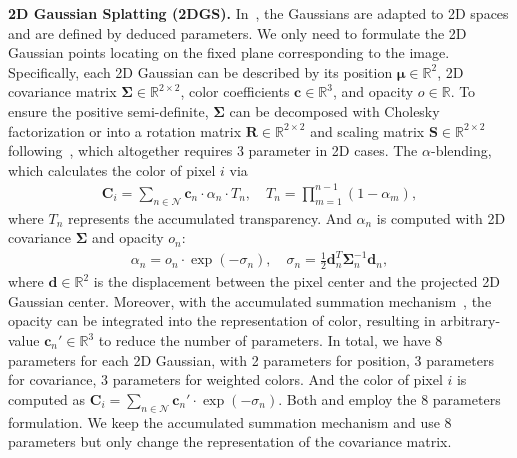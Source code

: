 \noindent \textbf{2D Gaussian Splatting (2DGS).}
In~\cite{zhang2024gaussianimage}, the Gaussians are adapted to 2D spaces and are defined by deduced parameters. We only need to formulate the 2D Gaussian points locating on the fixed plane corresponding to the image. Specifically, each 2D Gaussian can be described by its position $\bm \mu \in \mathbb{R}^{2}$, 2D covariance matrix $\bm \Sigma \in \mathbb{R}^{2\times 2}$, color coefficients $\bm c \in \mathbb{R}^3$, and opacity $o \in \mathbb{R}$. To ensure the positive semi-definite, $\bm \Sigma$ can be decomposed with Cholesky factorization or into a rotation matrix $\bm R \in \mathbb{R}^{2\times 2}$ and scaling matrix $\bm S \in \mathbb{R}^{2\times 2}$ following~\cite{kerbl20233d}, which altogether requires 3 parameter in 2D cases. The $\alpha$-blending, which calculates the color of pixel $i$ via
\begin{equation}
  \begin{aligned}
    \boldsymbol{C}_i = \sum_{n \in \mathcal{N}} \boldsymbol{c}_n \cdot \alpha_n \cdot T_n, \quad T_n = \prod_{m=1}^{n-1} (1 - \alpha_m),
  \end{aligned}
\end{equation}
where $T_n$ represents the accumulated transparency. And $\alpha_n$ is computed with 2D covariance $\boldsymbol{\Sigma}$ and opacity $o_n$:
\begin{equation}
  \begin{aligned}
    \alpha_n = o_n \cdot \exp(-\sigma_n), \quad \sigma_n = \frac{1}{2} \boldsymbol{d}_n^T \boldsymbol{\Sigma}_n^{-1} \boldsymbol{d}_n,
  \end{aligned}
\end{equation} 
where $\boldsymbol{d} \in \mathbb{R}^2$ is the displacement between the pixel center and the projected 2D Gaussian center. Moreover, with the accumulated summation mechanism~\cite{zhang2024gaussianimage}, the opacity can be integrated into the representation of color, resulting in arbitrary-value $\bm c_n' \in \mathbb{R}^3$ to reduce the number of parameters. In total, we have 8 parameters for each 2D Gaussian, with 2 parameters for position, 3 parameters for covariance, 3 parameters for weighted colors. And the color of pixel $i$ is computed as $\boldsymbol{C}_i = \sum_{n \in \mathcal{N}} \boldsymbol{c}_n' \cdot \exp(-\sigma_n).$
Both \cite{zhang2024gaussianimage} and \cite{zhang2024image} employ the 8 parameters formulation. We keep the accumulated summation mechanism and use 8 parameters but only change the representation of the covariance matrix.

